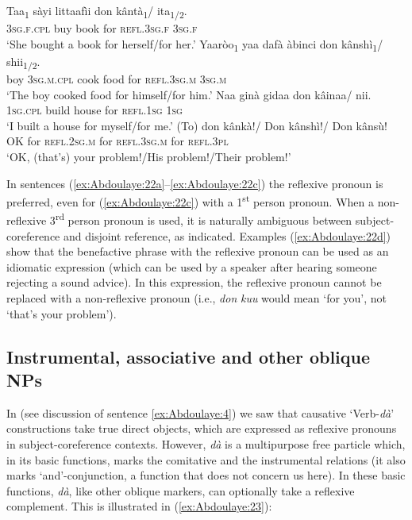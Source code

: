 \documentclass[output=paper]{langscibook}
\begin{document}
\ea%
    \label{ex:Abdoulaye:22}
    \ea \label{ex:Abdoulaye:22a}
    \gll Taa\textsubscript{1} sàyi  littaafìi  don  kântà\textsubscript{1}/  ita\textsubscript{1/2}.\\
    \textsc{3sg.f.cpl}  buy  book  for  \textsc{refl.3sg.f}  \textsc{3sg.f}\\
    \glt `She bought a book for herself/for her.’
    \ex \label{ex:Abdoulaye:22b}
    \gll Yaaròo\textsubscript{1} yaa  dafà  àbinci  don  kânshì\textsubscript{1}/  shii\textsubscript{1/2}.\\
    boy  \textsc{3sg.m.cpl}  cook  food  for  \textsc{refl.3sg.m}  \textsc{3sg.m}\\
    \glt `The boy cooked food for himself/for him.’
    \ex \label{ex:Abdoulaye:22c}
    \gll Naa  ginà  gidaa  don  kâinaa/  nii.\\
    \textsc{1sg.cpl}  build  house  for  \textsc{refl.1sg}  \textsc{1sg}\\
    \glt `I built a house for myself/for me.’
    \ex \label{ex:Abdoulaye:22d}
    \gll (To)  don  kânkà!/  Don  kânshì!/  Don  kânsù!\\
    OK  for  \textsc{refl.2sg.m}  for  \textsc{refl.3sg.m}  for  \textsc{refl.3pl}\\
    \glt `OK, (that’s) your problem!/His problem!/Their problem!’
    \z
\z
  
    
In sentences (\ref{ex:Abdoulaye:22a}--\ref{ex:Abdoulaye:22c}) the reflexive pronoun is preferred, even for (\ref{ex:Abdoulaye:22c}) with a 1\textsuperscript{st} person pronoun. When a non-reflexive 3\textsuperscript{rd} person pronoun is used, it is naturally ambiguous between subject-coreference and disjoint reference, as indicated. Examples (\ref{ex:Abdoulaye:22d}) show that the benefactive phrase with the reflexive pronoun can be used as an idiomatic expression (which can be used by a speaker after hearing someone rejecting a sound advice). In this expression, the reflexive pronoun cannot be replaced with a non-reflexive pronoun (i.e., \textit{don} \textit{kuu} would mean ‘for you’, not ‘that’s your problem’).

\subsection{Instrumental, associative and other oblique NPs}\label{sec:Abdoulaye:4.5}


In  (see discussion of sentence \ref{ex:Abdoulaye:4}) we saw that causative `Verb\nobreakdash-\textit{dà}’ constructions take true direct objects, which are expressed as reflexive pronouns in subject-coreference contexts. However, \textit{dà} is a multipurpose free particle which, in its basic functions, marks the comitative and the instrumental relations (it also marks ‘and’-conjunction, a function that does not concern us here). In these basic functions, \textit{dà}, like other oblique markers, can optionally take a reflexive complement. This is illustrated in (\ref{ex:Abdoulaye:23}):
\end{document}
